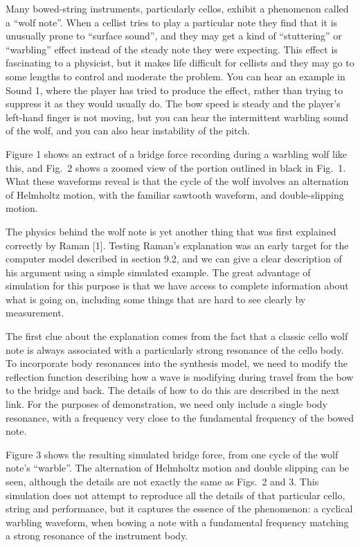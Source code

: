 

  Many bowed-string instruments, particularly cellos, exhibit a phenomenon 
  called a “wolf note”. When a cellist tries to play a particular note they 
  find that it is unusually prone to ``surface sound'', and they may get a kind 
  of “stuttering” or “warbling” effect instead of the steady note they were 
  expecting. This effect is fascinating to a physicist, but it makes life 
  difficult for cellists and they may go to some lengths to control and 
  moderate the problem. You can hear an example in Sound 1, where the player 
  has tried to produce the effect, rather than trying to suppress it as they 
  would usually do. The bow speed is steady and the player's left-hand finger 
  is not moving, but you can hear the intermittent warbling sound of the wolf, 
  and you can also hear instability of the pitch. 

  Figure 1 shows an extract of a bridge force recording during a warbling wolf 
  like this, and Fig.\ 2 shows a zoomed view of the portion outlined in black 
  in Fig.\ 1. What these waveforms reveal is that the cycle of the wolf 
  involves an alternation of Helmholtz motion, with the familiar sawtooth 
  waveform, and double-slipping motion. 

  The physics behind the wolf note is yet another thing that was first 
  explained correctly by Raman [1]. Testing Raman’s explanation was an early 
  target for the computer model described in section 9.2, and we can give a 
  clear description of his argument using a simple simulated example. The great 
  advantage of simulation for this purpose is that we have access to complete 
  information about what is going on, including some things that are hard to 
  see clearly by measurement. 

  The first clue about the explanation comes from the fact that a classic cello 
  wolf note is always associated with a particularly strong resonance of the 
  cello body. To incorporate body resonances into the synthesis model, we need 
  to modify the reflection function describing how a wave is modifying during 
  travel from the bow to the bridge and back. The details of how to do this are 
  described in the next link. For the purposes of demonstration, we need only 
  include a single body resonance, with a frequency very close to the 
  fundamental frequency of the bowed note. 

  Figure 3 shows the resulting simulated bridge force, from one cycle of the 
  wolf note's ``warble''. The alternation of Helmholtz motion and double 
  slipping can be seen, although the details are not exactly the same as Figs.\ 
  2 and 3. This simulation does not attempt to reproduce all the details of 
  that particular cello, string and performance, but it captures the essence of 
  the phenomenon: a cyclical warbling waveform, when bowing a note with a 
  fundamental frequency matching a strong resonance of the instrument body. 

